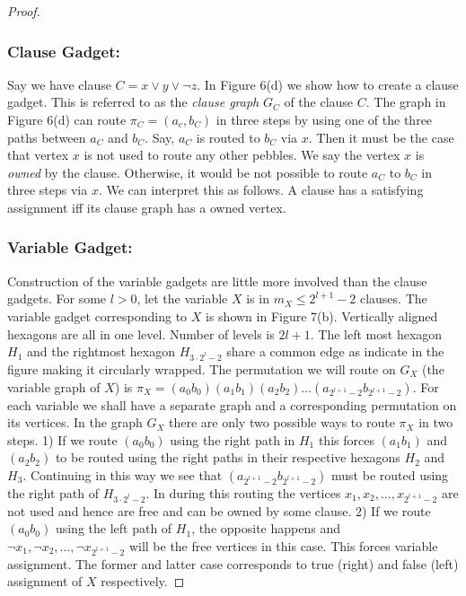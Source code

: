 \documentclass[runningheads,a4paper]{llncs}
\begin{document}
\begin{proof}
	\subsubsection{Clause Gadget:} Say we have clause $C = x \vee y \vee \neg z$. In Figure 6(d) we show how to create a clause gadget. This is referred to as the \textit{clause graph} $G_C$ of the clause $C$. The graph in Figure 6(d) can route $\pi_C=(a_c,b_C)$ in three steps by using one of the three paths between $a_C$ and $b_C$. Say, $a_C$ is routed to $b_C$ via $x$. Then it must be the case that vertex $x$ is not used to route any other pebbles. We say the vertex $x$ is \textit{owned} by the clause. Otherwise, it would be not possible to route $a_C$ to $b_C$ in three steps via $x$. We can interpret this as follows. A clause has a satisfying assignment iff its clause graph has a owned vertex.
	
	\subsubsection{Variable Gadget:} Construction of the variable gadgets are little more involved than the clause gadgets. For some $l > 0$, let the variable $X$ is in $m_X \le 2^{l+1}-2$ clauses. The variable gadget corresponding to $X$ is shown in Figure 7(b). Vertically aligned hexagons are all in one level. Number of levels is $2l+1$. The left most hexagon $H_1$ and the rightmost hexagon $H_{3\cdot 2^{l}-2}$ share a common edge as indicate in the figure making it circularly wrapped. The permutation we will route on $G_X$ (the variable graph of $X$) is $\pi_X = (a_0b_0)(a_1b_1)(a_2b_2)\ldots(a_{2^{l+1}-2}b_{2^{l+1}-2})$. For each variable we shall have a separate graph and a corresponding permutation on its vertices. In the graph $G_X$ there are only two possible ways to route $\pi_X$ in two steps. 1) If we route $(a_0b_0)$ using the right path in $H_1$ this forces $(a_1b_1)$ and $(a_2b_2)$ to be routed using the right paths in their respective hexagons $H_2$ and $H_3$. Continuing in this way we see that $(a_{2^{l+1}-2}b_{2^{l+1}-2})$ must be routed using the right path of $H_{3\cdot 2^{l}-2}$. In during this routing the vertices $x_1,x_2,\ldots,x_{2^{l+1}-2}$ are not used and hence are free and can be owned by some clause. 2) If we route $(a_0b_0)$ using the left path of $H_1$, the opposite happens and $\neg x_1,\neg x_2,\ldots,\neg x_{2^{l+1}-2}$ will be the free vertices in this case. This forces variable assignment. The former and latter case corresponds to true (right) and false (left) assignment of $X$ respectively.
	

\end{proof}
\end{document}
